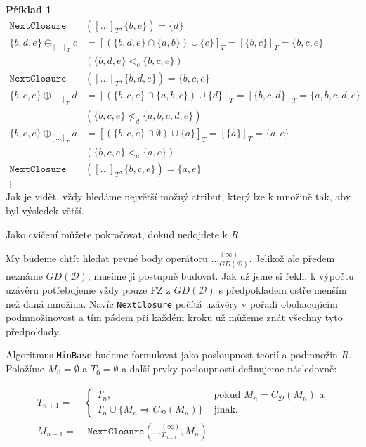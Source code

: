 \documentclass{article}
\theoremstyle {definition}
\newtheorem{example}{Příklad}
\begin{document}
\begin{example}
\begin{align*}
    \texttt{NextClosure}&([\dots]_{T},\{b,e\})=\{d\}\\
    \{b,d,e\} \oplus_{[\dots]_{T}} c
    &= [(\{b,d,e\}\cap \{a,b\})\cup\{c\}]_{T} =
      [\{b,c\}]_{T} = \{b,c,e\}\\
    &(\{b,d,e\}<_c \{b,c,e\})\\
    \texttt{NextClosure}&([\dots]_{T},\{b,d,e\})=\{b,c,e\}\\
    \{b,c,e\} \oplus_{[\dots]_{T}} d
    &= [(\{b,c,e\}\cap \{a,b,c\})\cup\{d\}]_{T} =
      [\{b,c,d\}]_{T} = \{a,b,c,d,e\}\\
    &(\{b,c,e\}\not<_d \{a,b,c,d,e\})\\
    \{b,c,e\} \oplus_{[\dots]_{T}} a
    &= [(\{b,c,e\}\cap \emptyset)\cup\{a\}]_{T} =
      [\{a\}]_{T} = \{a,e\}\\
    &(\{b,c,e\}<_a \{a,e\})\\
    \texttt{NextClosure}&([\dots]_{T},\{b,c,e\})=\{a,e\}\\
    \vdots
  \end{align*}  
  Jak je vidět, vždy hledáme největší možný atribut, který lze
   k množině tak, aby byl výsledek větší.

  Jako cvičení můžete pokračovat, dokud nedojdete k $R$.
\end{example}

My budeme chtít hledat pevné body operátoru
$\dots^{(\infty)}_{GD(\mathcal{D})}$. Jelikož ale předem neznáme
$GD(\mathcal D)$, musíme ji postupně budovat. Jak už jsme si řekli, k
výpočtu uzávěru potřebujeme vždy pouze FZ z $GD(\mathcal D)$ s
předpokladem ostře menším než daná množina. Navíc \texttt{NextClosure}
počítá uzávěry v pořadí obohacujícím podmnožinovost a tím pádem při
každém kroku už můžeme znát všechny tyto předpoklady.

Algoritmus \texttt{MinBase} budeme formulovat jako posloupnost teorií
a podmnožin $R$. Položíme $M_0=\emptyset$ a $T_0=\emptyset$ a další
prvky posloupnosti definujeme následovně:

\begin{align*}
  T_{n+1}=&
  \begin{cases}
    T_n,
    & \text{ pokud } M_n=C_{\mathcal D}(M_n) \text{ a}\\
    T_n\cup\{M_n\Rightarrow C_{\mathcal D}(M_n)\}
    & \text{ jinak.}
  \end{cases}\\
  M_{n+1} =&\texttt{ NextClosure}(\dots^{(\infty)}_{T_{n+1 }},M_n)
\end{align*}
\end{document}
